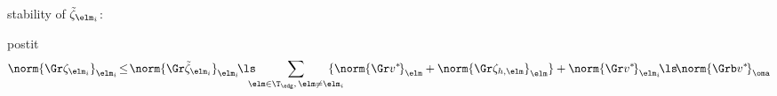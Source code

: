 \documentclass[compress]{beamer}
\begin{document}
\begin{frame}
\item stability of $\tilde \zeta_{\elm_i}$:

\ei

\vspace*{-0.1cm}

\hspace*{-0.4cm}\begin{beamercolorbox}[ht=3.8ex,wd=1.09\textwidth,rounded=true]{postit}
\[
    \vspace*{-0.5cm} \norm{\Gr \zeta_{\elm_i}}_{\elm_i} \! \leq \! \norm{\Gr \tilde \zeta_{\elm_i}}_{\elm_i} \!
    \ls \!\!\!\!\! \sum_{\elm \in \T_\edg, \, \elm \neq \elm_i}\!\!\!\!\!\!\!\!\{\norm{\Gr v^*\!}_\elm + \norm{\Gr \zeta_{h,\elm}}_\elm\} + \norm{\Gr v^*\!}_{\elm_i}
    \! \ls \! \norm{\Grb v^*\!}_{\oma}
\]
\end{beamercolorbox}

\end{frame}
\end{document}
